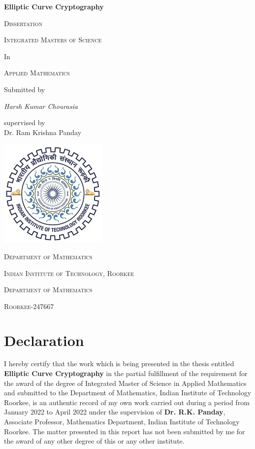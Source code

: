 \documentclass[12pt,a4paper]{report}
\begin{document}
\begin{titlepage}

	\begingroup
	\centering
	{\huge\bfseries Elliptic Curve Cryptography\par}
	\vspace{1cm}
	{\scshape\Large Dissertation\par}
	\vspace{1.5cm}
	{\scshape\LARGE Integrated Masters of Science \par}
	In\\
	{\scshape\LARGE Applied Mathematics \par}
	\vspace{2cm}
	Submitted by\\
	{\Large\itshape Harsh Kumar Chourasia\par}
	\vspace{0.5cm}
	supervised by\\
	Dr. Ram Krishna Panday
	\vspace{0.5cm}
	
	\includegraphics[scale=0.75]{logo}
	
	\vspace{1cm}
	
	{\scshape\large Department of Mathematics\par}
	{\scshape\large Indian Institute of Technology, Roorkee\par}
	{\scshape\large Department of Mathematics\par}
	{\scshape\large Roorkee-247667\par}
	\endgroup
\end{titlepage}




	\section*{Declaration}
	I hereby certify that the work which is being presented in the thesis entitled \textbf{Elliptic Curve Cryptography} in the partial fulfillment of the requirement
for the award of the degree of Integrated Master of Science in Applied Mathematics
and submitted to the Department of Mathematics, Indian Institute of Technology
Roorkee, is an authentic record of my own work carried out during a period from
January 2022 to April 2022 under the supervision of \textbf{Dr. R.K. Panday}, Associate Professor, Mathematics Department, Indian Institute of Technology Roorkee.
The matter presented in this report has not been submitted by me for the
award of any other degree of this or any other institute.
\end{document}
